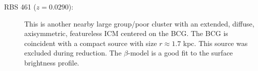 \begin{appendix}
\begin{description}
\item[RBS 461 ($z=0.0290$):] This is another nearby large group/poor
  cluster with an extended, diffuse, axisymmetric, featureless ICM
  centered on the BCG. The BCG is coincident with a compact source
  with size $r \approx 1.7$ kpc. This source was excluded during
  reduction. The $\beta$-model is a good fit to the surface brightness
  profile.
\end{description}






\end{appendix}
